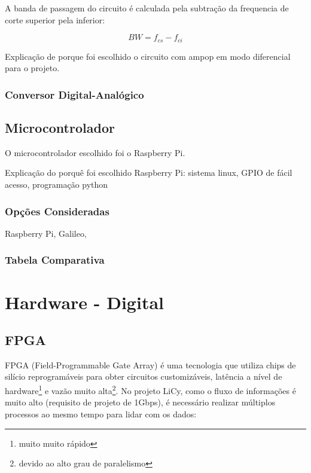	A banda de passagem do circuito é calculada pela subtração da frequencia de corte superior pela inferior:
	
	\begin{equation} \label{eq:4}
	BW = f_{cs} - f_{ci}
	\end{equation}
	
	Explicação de porque foi escolhido o circuito com ampop em modo diferencial para o projeto.
	
	\subsubsection{Conversor Digital-Analógico}
	
	\subsection{Microcontrolador}\label{hard-uc}
	
	O microcontrolador escolhido foi o Raspberry Pi.

	
	Explicação do porquê foi escolhido Raspberry Pi: sistema linux, GPIO de fácil acesso, programação python
	
	\subsubsection{Opções Consideradas}\label{uc-options}
	
	Raspberry Pi, Galileo, 
	
	\subsubsection{Tabela Comparativa}\label{uc-table}
	

	\section{Hardware - Digital}\label{sec-hardware-digital}
	\subsection{FPGA}\label{hard-fpga}
	
	FPGA (Field-Programmable Gate Array) é uma tecnologia que utiliza chips de silício reprogramáveis para obter circuitos customizáveis, latência a nível de hardware\footnote{muito muito rápido} e vazão muito alta\footnote{devido ao alto grau de paralelismo}. No projeto LiCy, como o fluxo de informações é muito alto (requisito de projeto de 1Gbps), é necessário realizar múltiplos processos ao mesmo tempo para lidar com os dados:
	
